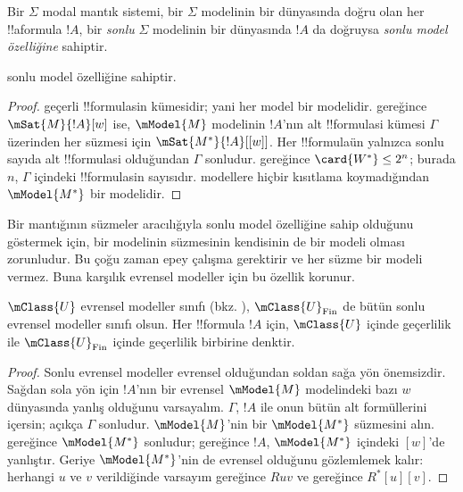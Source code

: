 



\begin{defn}
  Bir $\Sigma$ modal mantık sistemi, bir $\Sigma$ modelinin bir dünyasında
  doğru olan her !!a{formula} $!A$, bir \emph{sonlu} $\Sigma$ modelinin bir
  dünyasında $!A$ da doğruysa \emph{sonlu model özelliğine} sahiptir.
\end{defn}

\begin{prop}
   sonlu model özelliğine sahiptir.
\end{prop}

\begin{proof}
   geçerli !!{formula}s{}in kümesidir; yani her model bir
   modelidir.  gereğince
  $\mSat{M}{!A}[w]$ ise, $\mModel{M}$ modelinin $!A$'nın alt
  !!{formula}s{}i kümesi $\Gamma$ üzerinden her süzmesi için
  $\mSat{M^*}{!A}[{[w]}]$. Her !!{formula}{}ün yalnızca sonlu sayıda alt
  !!{formula}s{}i olduğundan $\Gamma$ sonludur.
   gereğince
  $\card{W^*}\leq2^n$; burada $n$, $\Gamma$ içindeki !!{formula}s{}in
  sayısıdır.  modellere hiçbir kısıtlama koymadığından
  $\mModel{M^*}$ bir  modelidir.
\end{proof}

Bir  mantığının süzmeler aracılığıyla sonlu model özelliğine sahip
olduğunu göstermek için, bir  modelinin süzmesinin kendisinin de
bir  modeli olması zorunludur. Bu çoğu zaman epey çalışma
gerektirir ve her süzme bir  modeli vermez. Buna karşılık evrensel
modeller için bu özellik korunur.

\begin{prop}
  $\mClass{U}$ evrensel modeller sınıfı
  (bkz. ),
  $\mClass{U}_\mathrm{Fin}$ de bütün sonlu evrensel modeller sınıfı olsun.
  Her !!{formula} $!A$ için, $\mClass{U}$ içinde geçerlilik ile
  $\mClass{U}_\mathrm{Fin}$ içinde geçerlilik birbirine denktir.
\end{prop}

\begin{proof}
  Sonlu evrensel modeller evrensel olduğundan soldan sağa yön önemsizdir.
  Sağdan sola yön için $!A$'nın bir evrensel $\mModel{M}$ modelindeki bazı
  $w$ dünyasında yanlış olduğunu varsayalım. $\Gamma$, $!A$ ile onun bütün
  alt formüllerini içersin; açıkça $\Gamma$ sonludur. $\mModel{M}$'nin bir
  $\mModel{M^*}$ süzmesini alın. 
  gereğince $\mModel{M^*}$ sonludur; 
  gereğince $!A$, $\mModel{M^*}$ içindeki $[w]$'de yanlıştır. Geriye
  $\mModel{M^*}$'nin de evrensel olduğunu gözlemlemek kalır: herhangi $u$ ve $v$
  verildiğinde varsayım gereğince $Ruv$ ve
   gereğince
  $R^*[u][v]$.
\end{proof}


